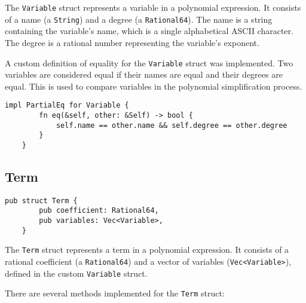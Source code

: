 The \verb|Variable| struct represents a variable in a polynomial expression. It consists of a name (a \verb|String|) and a degree (a \verb|Rational64|). The name is a string containing the variable's name, which is a single alphabetical ASCII character. The degree is a rational number representing the variable's exponent.

A custom definition of equality for the \verb|Variable| struct was implemented. Two variables are considered equal if their names are equal and their degrees are equal. This is used to compare variables in the polynomial simplification process.

\begin{lstlisting}[caption={The implementation of \texttt{PartialEq} for the \texttt{Variable} struct}, label={lst:variable-eq}]
    impl PartialEq for Variable {
        fn eq(&self, other: &Self) -> bool {
            self.name == other.name && self.degree == other.degree
        }
    }
\end{lstlisting}

\subsection{Term}\label{subsec:term}

\begin{lstlisting}[caption={The \texttt{Term} struct}, label={lst:term}]
    pub struct Term {
        pub coefficient: Rational64,
        pub variables: Vec<Variable>,
    }    
\end{lstlisting}

The \verb|Term| struct represents a term in a polynomial expression. It consists of a rational coefficient (a \verb|Rational64|) and a vector of variables (\verb|Vec<Variable>|), defined in the custom \texttt{Variable} struct.

There are several methods implemented for the \verb|Term| struct:

